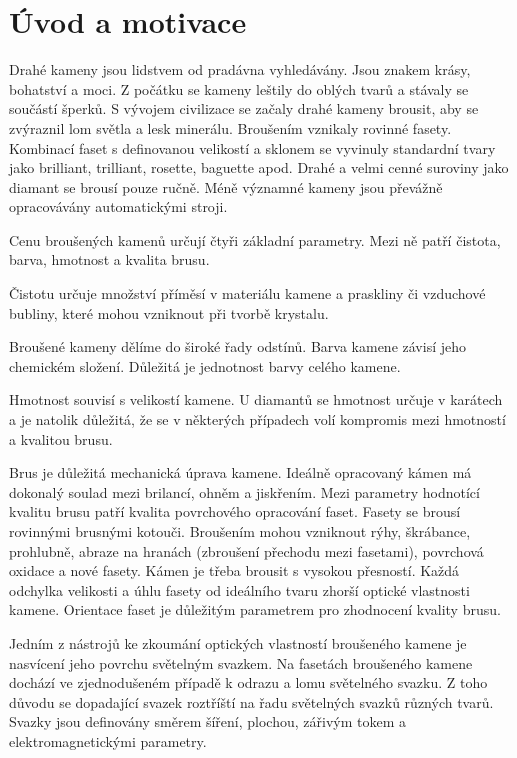 \part{Úvod a motivace}

Drahé kameny jsou lidstvem od pradávna vyhledávány.
Jsou znakem krásy, bohatství a moci. Z počátku se kameny leštily do oblých tvarů a stávaly se součástí šperků.
S vývojem civilizace se začaly drahé kameny brousit, aby se zvýraznil lom světla a lesk minerálu. Broušením vznikaly rovinné fasety. Kombinací faset s definovanou velikostí a sklonem se vyvinuly standardní tvary jako brilliant, trilliant, rosette, baguette apod. Drahé a velmi cenné suroviny jako diamant se brousí pouze ručně. Méně významné kameny jsou převážně opracovávány automatickými stroji.  

Cenu broušených kamenů určují čtyři základní parametry. Mezi ně patří čistota, barva, hmotnost a kvalita brusu. 

Čistotu určuje množství příměsí v materiálu kamene a praskliny či vzduchové bubliny, které mohou vzniknout při tvorbě krystalu.

Broušené kameny dělíme do široké řady odstínů. Barva kamene závisí jeho chemickém složení. Důležitá je jednotnost barvy celého kamene.

Hmotnost souvisí s velikostí kamene. U diamantů se hmotnost určuje v karátech a je natolik důležitá, že se v některých případech volí kompromis mezi hmotností a kvalitou brusu.

Brus je důležitá mechanická úprava kamene. Ideálně opracovaný kámen má dokonalý soulad mezi brilancí, ohněm a jiskřením. Mezi parametry hodnotící kvalitu brusu patří kvalita povrchového opracování faset. Fasety se brousí rovinnými brusnými kotouči. Broušením mohou vzniknout rýhy, škrábance, prohlubně, abraze na hranách (zbroušení přechodu mezi fasetami), povrchová oxidace a nové fasety. Kámen je třeba brousit s vysokou přesností. Každá odchylka velikosti a úhlu fasety od ideálního tvaru zhorší optické vlastnosti kamene. Orientace faset je důležitým parametrem pro zhodnocení kvality brusu.

Jedním z nástrojů ke zkoumání optických vlastností broušeného kamene je nasvícení jeho povrchu světelným svazkem. Na fasetách broušeného kamene dochází ve zjednodušeném případě k odrazu a lomu světelného svazku. Z toho důvodu se dopadající svazek roztříští na řadu světelných svazků různých tvarů. Svazky jsou definovány směrem šíření, plochou, zářivým tokem a elektromagnetickými parametry. 

